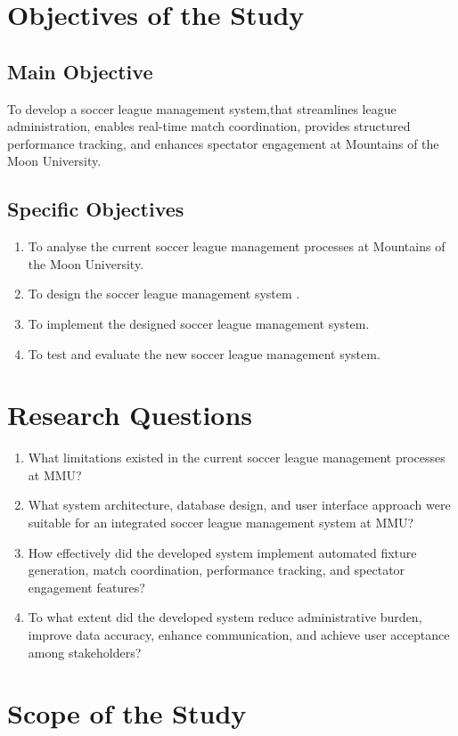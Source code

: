 \documentclass[12pt,a4paper]{report}
\begin{document}
\section{Objectives of the Study}
\subsection{Main Objective}
To develop a soccer league management system,that
streamlines league administration, enables real-time match coordination, provides structured
performance tracking, and enhances spectator engagement at Mountains of the Moon University.

\subsection{Specific Objectives}
\begin{enumerate}
  \item To analyse the current soccer league management processes at Mountains of the Moon University.
  \item To design the soccer league management system .
  \item To implement the designed soccer league management system.
  \item To test and evaluate the new soccer league management system.
\end{enumerate}

\section{Research Questions}
\begin{enumerate}
  \item What limitations existed in the current soccer league management processes at MMU?
  \item What system architecture, database design, and user interface approach were suitable for
        an integrated soccer league management system at MMU?
  \item How effectively did the developed system implement automated fixture generation, match
        coordination, performance tracking, and spectator engagement features?
  \item To what extent did the developed system reduce administrative burden, improve data
        accuracy, enhance communication, and achieve user acceptance among stakeholders?
\end{enumerate}

\section{Scope of the Study}
\end{document}
